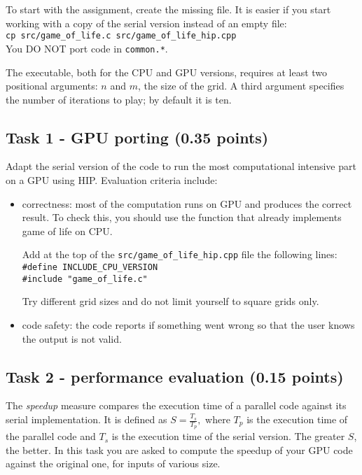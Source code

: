 \documentclass[a4paper, 11pt]{article}
\begin{document}
		To start with the assignment, create the missing file. It is easier if you start working with a copy of the serial version instead of an empty file:\\
		
		
		\indent\texttt{cp src/game\_of\_life.c src/game\_of\_life\_hip.cpp}\\
		
		\noindent You DO NOT port code in \texttt{common.*}.
	
	The executable, both for the CPU and GPU versions, requires at least two positional arguments: $n$ and $m$,  the size of the grid. A third argument specifies the number of iterations to play; by default it is ten.
		

	\subsection{Task 1 - GPU porting (0.35 points)}
	Adapt the serial version of the code to run the most computational intensive part on a GPU using HIP. Evaluation criteria include:
	\begin{itemize}
		\item correctness: most of the computation runs on GPU and produces the correct result. To check this, you should use the function that already implements game of life on CPU. 
		
		Add at the top of the \texttt{src/game\_of\_life\_hip.cpp} file the following lines:\\
		
		\indent\texttt{\#define INCLUDE\_CPU\_VERSION}\\
		\indent\texttt{\#include "game\_of\_life.c"}
		
		\noindent Try different grid sizes and do not limit yourself to square grids only.
		
		\item code safety: the code reports if something went wrong so that the user knows the output is not valid.
	\end{itemize}

	
	\subsection{Task 2 - performance evaluation (0.15 points)}
	
	The \emph{speedup} measure compares the execution time of a parallel code against its serial implementation. It is defined as
	\begin{math}
	S = \frac{T_s}{T_p},
	\end{math}
	where $T_p$ is the execution time of the parallel code and $T_s$ is the execution time of the serial version. The greater $S$, the better.
	In this task you are asked to compute the speedup of your GPU code against the original one, for inputs of various size. 
	
\end{document}
